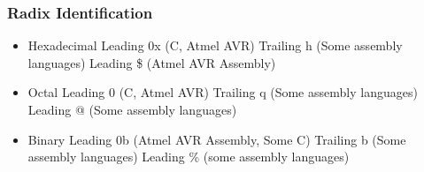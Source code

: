 \subsubsection{Radix Identification}
\begin{itemize}
	\item Hexadecimal
	\subitem Leading 0x (C, Atmel AVR)
	\subitem Trailing h (Some assembly languages)
	\subitem Leading \$ (Atmel AVR Assembly)
	
	\item Octal
	\subitem Leading 0 (C, Atmel AVR)
	\subitem Trailing q (Some assembly languages)
	\subitem Leading @ (Some assembly languages)
	
	\item Binary
	\subitem Leading 0b (Atmel AVR Assembly, Some C)
	\subitem Trailing b (Some assembly languages)
	\subitem Leading \% (some assembly languages)
\end{itemize}